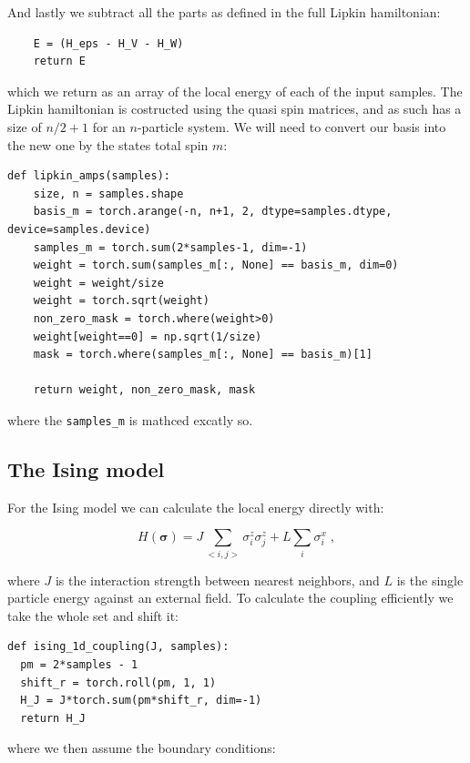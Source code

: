 And lastly we subtract all the parts as defined in the full Lipkin hamiltonian:

\begin{verbatim}
    E = (H_eps - H_V - H_W)
    return E
\end{verbatim}

which we return as an array of the local energy of each of the input samples. The Lipkin hamiltonian is costructed using the quasi spin matrices, and as such has a size of $n/2 + 1$ for an $n$-particle system. We will need to convert our basis into the new one by the states total spin $m$:

\begin{verbatim}
def lipkin_amps(samples):
    size, n = samples.shape
    basis_m = torch.arange(-n, n+1, 2, dtype=samples.dtype, device=samples.device)
    samples_m = torch.sum(2*samples-1, dim=-1)
    weight = torch.sum(samples_m[:, None] == basis_m, dim=0)
    weight = weight/size
    weight = torch.sqrt(weight)
    non_zero_mask = torch.where(weight>0)
    weight[weight==0] = np.sqrt(1/size)
    mask = torch.where(samples_m[:, None] == basis_m)[1]
    
    return weight, non_zero_mask, mask
\end{verbatim}

where the \texttt{samples_m} is mathced excatly so.

\subsection{The Ising model}

For the Ising model we can calculate the local energy directly with:

\begin{equation}
  H(\boldsymbol{\sigma}) = J\sum_{<i,j>}\sigma^z_i\sigma^z_j + L \sum_i \sigma^x_i \; ,
  \label{eq:imp_hamil_ising}
\end{equation}

where $J$ is the interaction strength between nearest neighbors, and $L$ is the single particle energy against an external field. To calculate the coupling efficiently we take the whole set and shift it:

\begin{verbatim}
def ising_1d_coupling(J, samples):
  pm = 2*samples - 1
  shift_r = torch.roll(pm, 1, 1)
  H_J = J*torch.sum(pm*shift_r, dim=-1)
  return H_J
\end{verbatim}

where we then assume the boundary conditions:

